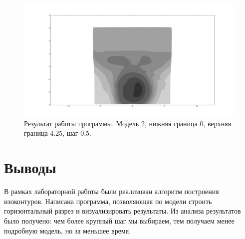 \documentclass[12pt,a4paper,oneside]{extarticle}
\begin{document}
    \begin{figure}[h!]
        \center
        \includegraphics[scale=0.25]{big3.png}
        \caption{Результат работы программы. Модель 2, нижняя граница 0, верхняя граница 4.25, шаг 0.5.}
        \label{pic:big3}
    \end{figure}


    
    \clearpage


\section{Выводы}
    В рамках лабораторной работы были реализован алгоритм построения изоконтуров. Написана программа, позволяющая по модели строить горизонтальный разрез и визуализировать результаты. Из анализа результатов было получено: чем более крупный шаг мы выбираем, тем получаем менее подробную модель, но за меньшее время.
    
\end{document}
